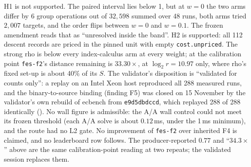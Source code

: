 \noindent H1 is not supported. The paired interval lies below 1, but at
$w=0$ the two arms differ by 6 group operations out of $32{,}598$ summed over
48 runs, both arms tried $2{,}007$ targets, and the order flips between $w=0$
and $w=0.1$. The frozen amendment reads that as ``unresolved inside the
band''. H2 is supported: all 112 descent records are priced in the pinned
unit with empty \texttt{cost.unpriced}. The strong rho is below every
index-calculus arm at every weight; at the calibration point
\texttt{fes-f2}'s distance remaining is $33.30\times$, at $\log_2r=10.97$
only, where rho's fixed set-up is about 40\% of its $S$. The validator's
disposition is ``validated for counts only'': a replay on an Intel Xeon
host reproduced all 288 measured runs, and the binary-to-source binding
(finding F5) was closed on 15 November by the validator's own rebuild of
ecbench from \texttt{e9d5dbdccd}, which replayed 288 of 288 identically
().
No wall figure is admissible: the A/A wall control could not meet its
frozen threshold (each A/A solve is about $0.12$\,ms, under the 1\,ms
minimum), and the route had no L2 gate. No improvement of \texttt{fes-f2}
over inherited F4 is claimed, and no leaderboard row follows. The
producer-reported $0.77$ and ``$34.3\times$'' above are the same
calibration-point reading at two repeats; the validated session replaces
them.

